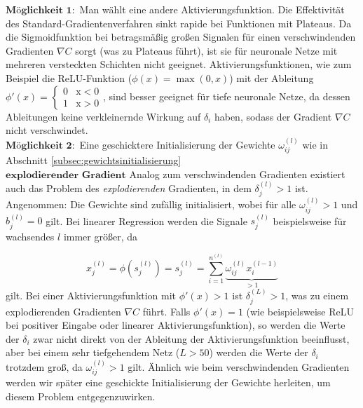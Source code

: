 $\textbf{Möglichkeit 1}:$ Man wählt eine andere Aktivierungsfunktion. Die Effektivität des Standard-Gradientenverfahren
sinkt rapide bei Funktionen mit Plateaus. Da die Sigmoidfunktion bei betragsmäßig großen Signalen für einen
verschwindenden Gradienten $\nabla C$ sorgt (was zu Plateaus führt), ist sie für neuronale Netze mit mehreren versteckten
Schichten nicht geeignet. Aktivierungsfunktionen, wie zum Beispiel die ReLU-Funktion ($\phi(x)=\max(0,x)$) mit der
Ableitung $\phi'(x)= \begin {cases} 0 &\text{x}<0\\ 1 &\text{x}>0\end{cases}$, sind besser geeignet für tiefe neuronale
Netze, da dessen Ableitungen keine verkleinernde Wirkung auf $\delta_i$ haben, sodass der Gradient $\nabla C$ nicht
verschwindet.\\
$\textbf{Möglichkeit 2}:$ Eine geschicktere Initialisierung der Gewichte $\omega_{ij}^{(l)}$ wie in Abschnitt
\eqref{subsec:gewichtsinitialisierung}\\
$\textbf{explodierender Gradient}$
Analog zum verschwindenden Gradienten existiert auch das Problem des \textit{explodierenden} Gradienten, in dem
$\delta_j^{(l)}>1$ ist.\\
Angenommen: Die Gewichte sind zufällig initialisiert, wobei für alle $\omega_{ij}^{(l)}>1$ und $b_j^{(l)}=0$
gilt. Bei linearer Regression werden die Signale $s_j^{(l)}$  beispielsweise für wachsendes $l$ immer größer, da

\[
    x_j^{(l)}=\phi(s_j^{(l)})=s_j^{(l)}=\sum\limits_{i=1}^{n^{(l)}} \underbrace{\omega_{ij}^{(l)}x_{i}^{(l-1)}}_{>1}
\]
gilt. Bei einer Aktivierungsfunktion mit $\phi'(x)>1$ ist $\delta_j^{(L)}>1$, was zu einem explodierenden Gradienten $\nabla C$
führt. Falls $\phi'(x)=1$ (wie beispielsweise ReLU bei positiver Eingabe oder linearer Aktivierungsfunktion), so werden
die Werte der $\delta_i$ zwar nicht direkt von der Ableitung der Aktivierungsfunktion beeinflusst, aber bei einem sehr
tiefgehendem Netz ($L>50$) werden die Werte der $\delta_i$ trotzdem groß, da $\omega_{ij}^{(l)}>1$ gilt. Ähnlich wie beim
verschwindenden Gradienten werden wir später eine geschickte Initialisierung der Gewichte herleiten, um diesem Problem
entgegenzuwirken.

